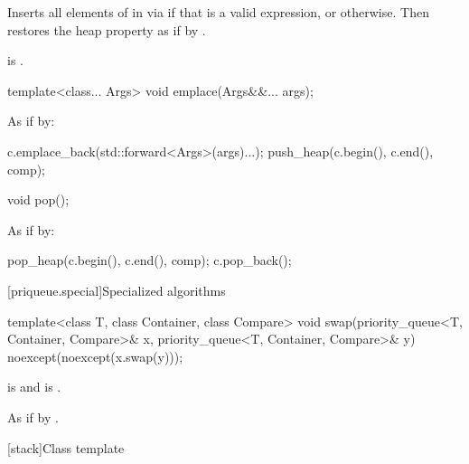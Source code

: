 \begin{itemdescr}
\pnum
\effects
Inserts all elements of  in  via
 if that is a valid expression, or
 otherwise.
Then restores the heap property as if by
.

\pnum
\ensures
{} is .
\end{itemdescr}

%
\begin{itemdecl}
template<class... Args> void emplace(Args&&... args);
\end{itemdecl}

\begin{itemdescr}
\pnum
\effects
As if by:
\begin{codeblock}
c.emplace_back(std::forward<Args>(args)...);
push_heap(c.begin(), c.end(), comp);
\end{codeblock}
\end{itemdescr}


%
\begin{itemdecl}
void pop();
\end{itemdecl}

\begin{itemdescr}
\pnum
\effects
As if by:
\begin{codeblock}
pop_heap(c.begin(), c.end(), comp);
c.pop_back();
\end{codeblock}
\end{itemdescr}

[priqueue.special]{Specialized algorithms}

%
\begin{itemdecl}
template<class T, class Container, class Compare>
  void swap(priority_queue<T, Container, Compare>& x,
            priority_queue<T, Container, Compare>& y) noexcept(noexcept(x.swap(y)));
\end{itemdecl}

\begin{itemdescr}
\pnum
\constraints
{} is  and
 is .

\pnum
\effects
As if by .
\end{itemdescr}

[stack]{Class template }

